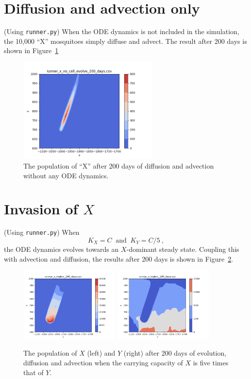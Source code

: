 \documentclass{article}
\begin{document}
\section{Diffusion and advection only}

(Using {\tt runner.py})  When the ODE dynamics is not included in the simulation, the 10,000 ``X'' mosquitoes simply diffuse and advect.  The result after 200 days is shown in Figure~\ref{runner_x_no_cell_evolve_200_days.fig}

\begin{figure}[htb]
  \centering
  \includegraphics[width=7cm]{runner_x_no_cell_evolve_200_days.png}
  \caption{\label{runner_x_no_cell_evolve_200_days.fig}The population of ``X'' after 200 days of diffusion and advection without any ODE dynamics.}
\end{figure}


\section{Invasion of $X$}

(Using {\tt runner.py})  When
\begin{equation}
  K_{X} = C \ \mbox{ and }\ K_{Y} = C/5 \ ,
\end{equation}
the ODE dynamics evolves towards an $X$-dominant steady state.  Coupling this with advection and diffusion, the results after 200 days is shown in Figure~\ref{runner_x_highcc_200_days.fig}.

\begin{figure}[htb]
  \centering
  \includegraphics[width=5cm]{runner_x_highcc_200_days.png} \quad
  \includegraphics[width=5cm]{runner_y_highcc_200_days.png}
  \caption{\label{runner_x_highcc_200_days.fig}The population of $X$ (left) and $Y$ (right) after 200 days of evolution, diffusion and advection when the carrying capacity of $X$ is five times that of $Y$.}
\end{figure}
\end{document}
